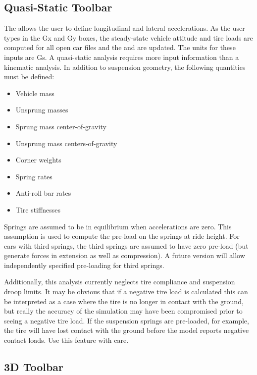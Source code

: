 \subsection{Quasi-Static Toolbar} \label{ssec:quasiStaticToolbar}

The  allows the user to define longitudinal and lateral accelerations.  As the user types in the Gx and Gy boxes, the steady-state vehicle attitude and tire loads are computed for all open car files and the  and  are updated.  The units for these inputs are Gs.  A quasi-static analysis requires more input information than a kinematic analysis.  In addition to suspension geometry, the following quantities must be defined:

\begin{itemize}
\item Vehicle mass
\item Unsprung masses
\item Sprung mass center-of-gravity
\item Unsprung mass centers-of-gravity
\item Corner weights
\item Spring rates
\item Anti-roll bar rates
\item Tire stiffnesses
\end{itemize}

Springs are assumed to be in equilibrium when accelerations are zero.  This assumption is used to compute the pre-load on the springs at ride height.  For cars with third springs, the third springs are assumed to have zero pre-load (but generate forces in extension as well as compression).  A future version will allow independently specified pre-loading for third springs.

Additionally, this analysis currently neglects tire compliance and suspension droop limits.  It may be obvious that if a negative tire load is calculated this can be interpreted as a case where the tire is no longer in contact with the ground, but really the accuracy of the simulation may have been compromised prior to seeing a negative tire load.  If the suspension springs are pre-loaded, for example, the tire will have lost contact with the ground before the model reports negative contact loads.  Use this feature with care.

\subsection{3D Toolbar} \label{ssec:3DToolbar}

